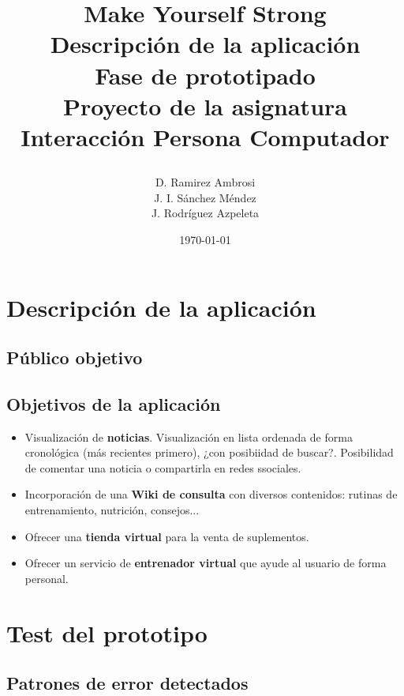\documentclass[a4paper]{article}
\date{}
\author{D. Ramirez Ambrosi \\ J. I. Sánchez Méndez \\ J. Rodríguez Azpeleta}
\title{\begin{center}
\textbf{\Huge{Make Yourself Strong}} \\ Descripción de la aplicación \\ Fase de prototipado \\Proyecto de la asignatura Interacción Persona Computador
\end{center}}
\date{\today}
\renewcommand\listfigurename{\centering LISTA DE FIGURAS}
\begin{document}
\maketitle

\thispagestyle{empty}%
\newpage
\tableofcontents%
\thispagestyle{empty}
\newpage





\setcounter{page}{1}%

\section{Descripción de la aplicación}

\subsection{Público objetivo}

\subsection{Objetivos de la aplicación}

\begin{itemize}
	\item	Visualización de \textbf{noticias}. Visualización en lista ordenada de forma cronológica (más recientes primero), ¿con posibiidad de buscar?. Posibilidad de comentar una noticia o compartirla en redes ssociales.
	
	\item	Incorporación de una \textbf{Wiki de consulta} con diversos contenidos: rutinas de entrenamiento, nutrición, consejos...
	
	\item	Ofrecer una \textbf{tienda virtual} para la venta de suplementos.
	
	\item	Ofrecer un servicio de \textbf{entrenador virtual} que ayude al usuario de forma personal.
\end{itemize}

\section{Test del prototipo}

\subsection{Patrones de error detectados}
\end{document}

